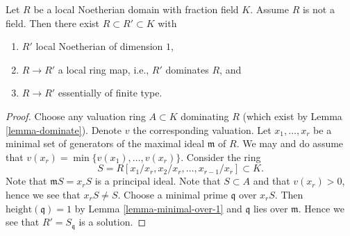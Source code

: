 \begin{lemma}
\label{lemma-dominate-by-dimension-1}
Let $R$ be a local Noetherian domain with fraction field $K$.
Assume $R$ is not a field.
Then there exist $R \subset R' \subset K$ with
\begin{enumerate}
\item $R'$ local Noetherian of dimension $1$,
\item $R \to R'$ a local ring map, i.e., $R'$ dominates $R$, and
\item $R \to R'$ essentially of finite type.
\end{enumerate}
\end{lemma}

\begin{proof}
Choose any valuation ring $A \subset K$ dominating $R$ (which
exist by Lemma \ref{lemma-dominate}).
Denote $v$ the corresponding valuation.
Let $x_1, \ldots, x_r$ be a minimal set of generators of the
maximal ideal $\mathfrak m$ of $R$. We may and do assume that
$v(x_r) = \min\{v(x_1), \ldots, v(x_r)\}$. Consider the ring
$$
S = R[x_1/x_r, x_2/x_r, \ldots, x_{r - 1}/x_r] \subset K.
$$
Note that $\mathfrak mS = x_rS$ is a principal ideal.
Note that $S \subset A$ and that $v(x_r) > 0$, hence we see
that $x_rS \not = S$. Choose a minimal prime $\mathfrak q$
over $x_rS$. Then $\text{height}(\mathfrak q) = 1$ by
Lemma \ref{lemma-minimal-over-1}
and $\mathfrak q$ lies over $\mathfrak m$. Hence we
see that $R' = S_{\mathfrak q}$ is a solution.
\end{proof}
